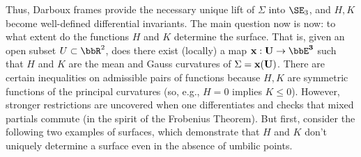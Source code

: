 Thus, Darboux frames provide the necessary unique lift of $\Sigma$ into $\SE_3$, and $H,K$ become well-defined differential invariants. The main question now is now: to what extent do the functions $H$ and $K$ determine the surface. That is, given an open subset $U\subset\bbR^2$, does there exist (locally) a map $\bf{x}:U\to \bbE^3$ such that $H$ and $K$ are the mean and Gauss curvatures of $\Sigma=\bf{x}(U)$. There are certain inequalities on admissible pairs of functions because $H,K$ are symmetric functions of the principal curvatures (so, e.g., $H=0$ implies $K\leq 0$). However, stronger restrictions are uncovered when one differentiates and checks that mixed partials commute (in the spirit of the Frobenius Theorem). But first, consider the following two examples of surfaces, which demonstrate that $H$ and $K$ don't uniquely determine a surface even in the absence of umbilic points.


